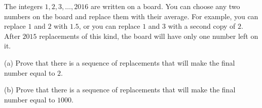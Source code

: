 The integers $1, 2, 3, \ldots, 2016$ are written on a board. You can choose any two numbers on the board and replace them with their average. For example, you can replace $1$ and $2$ with $1.5$,  or you can replace $1$ and $3$ with a second copy of $2$. After $2015$ replacements of this kind, the board will have only one number left on it.

(a) Prove that there is a sequence of replacements that will make the final number equal to $2$.

(b) Prove that there is a sequence of replacements that will make the final number equal to $1000$.